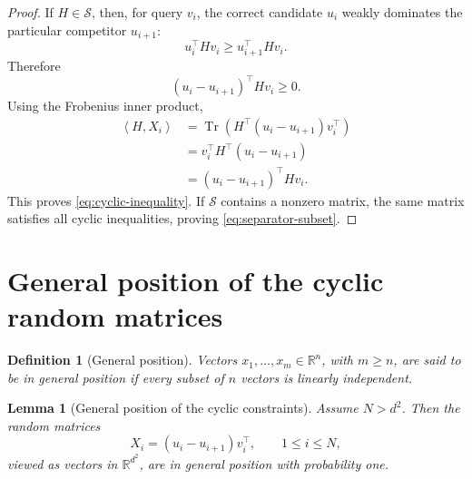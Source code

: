 \documentclass[11pt]{article}
\newtheorem{lemma}[theorem]{Lemma}
\newtheorem{definition}[theorem]{Definition}
\newcommand{\R}{\mathbb{R}}
\newcommand{\ip}[2]{\left\langle #1,#2\right\rangle}
\newcommand{\cS}{\mathcal{S}}
\newcommand{\1}{\mathbf{1}}
\begin{document}
\begin{proof}
If \(H\in\cS\), then, for query \(v_i\), the correct candidate \(u_i\)
weakly dominates the particular competitor \(u_{i+1}\):
\[
u_i^\top Hv_i
\ge
u_{i+1}^\top Hv_i.
\]
Therefore
\[
(u_i-u_{i+1})^\top Hv_i\ge 0.
\]
Using the Frobenius inner product,
\begin{align*}
\ip{H}{X_i}
&=
\operatorname{Tr}
\left(
H^\top
(u_i-u_{i+1})v_i^\top
\right)
\\
&=
v_i^\top H^\top(u_i-u_{i+1})
\\
&=
(u_i-u_{i+1})^\top Hv_i.
\end{align*}
This proves \eqref{eq:cyclic-inequality}. If \(\cS\) contains a nonzero
matrix, the same matrix satisfies all cyclic inequalities, proving
\eqref{eq:separator-subset}.
\end{proof}

\section{General position of the cyclic random matrices}

\begin{definition}[General position]
Vectors \(x_1,\dots,x_m\in\R^n\), with \(m\ge n\), are said to be in
general position if every subset of \(n\) vectors is linearly independent.
\end{definition}

\begin{lemma}[General position of the cyclic constraints]
\label{lem:general-position}
Assume \(N>d^2\). Then the random matrices
\[
X_i=(u_i-u_{i+1})v_i^\top,
\qquad
1\le i\le N,
\]
viewed as vectors in \(\R^{d^2}\), are in general position with
probability one.
\end{lemma}
\end{document}
